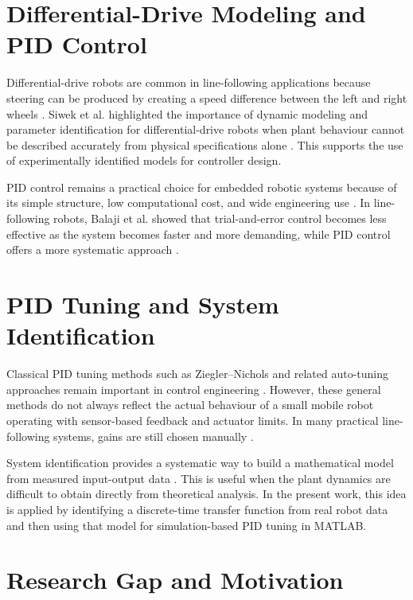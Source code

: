 \documentclass[a4paper,12pt,oneside]{book}
\begin{document}
\section{Differential-Drive Modeling and PID Control}

Differential-drive robots are common in line-following applications because
steering can be produced by creating a speed difference between the left and
right wheels \cite{balaji2015}. Siwek et al. highlighted the importance of
dynamic modeling and parameter identification for differential-drive robots when
plant behaviour cannot be described accurately from physical specifications
alone \cite{siwek2023}. This supports the use of experimentally identified
models for controller design.

PID control remains a practical choice for embedded robotic systems because of
its simple structure, low computational cost, and wide engineering use
\cite{borase2020}. In line-following robots, Balaji et al. showed that
trial-and-error control becomes less effective as the system becomes faster and
more demanding, while PID control offers a more systematic approach
\cite{balaji2015}.

\section{PID Tuning and System Identification}

Classical PID tuning methods such as Ziegler--Nichols and related auto-tuning
approaches remain important in control engineering
\cite{ziegler1942,astrom1984,hang2002}. However, these general methods do not
always reflect the actual behaviour of a small mobile robot operating with
sensor-based feedback and actuator limits. In many practical line-following
systems, gains are still chosen manually \cite{balaji2015}.

System identification provides a systematic way to build a mathematical model
from measured input-output data \cite{ljung1999,ljung2010}. This is useful when
the plant dynamics are difficult to obtain directly from theoretical analysis.
In the present work, this idea is applied by identifying a discrete-time
transfer function from real robot data and then using that model for
simulation-based PID tuning in MATLAB.

\section{Research Gap and Motivation}
\end{document}
